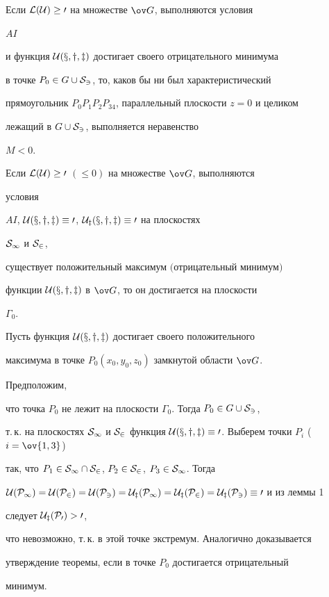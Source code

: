 \begin{lem} 


Если $\cal L(\cal U)\ge0$ на множестве $\ov G$, выполняются условия 


$AI$ 


и функция $\cal U(x,y,z)$ достигает своего отрицательного минимума 


в точке $P_0\in G\cup\cal S_3$, то, каков бы ни был характеристический 


прямоугольник $P_0P_1P_2P_34$, параллельный плоскости $z=0$ и целиком 


лежащий в $G\cup\cal S_3$, выполняется неравенство 


$M<0$. 


\end{lem} 


 


\begin{thm} 


Если $\cal L(\cal U)\ge0$ $(\le0)$ на множестве $\ov G$, выполняются 


условия 


$AI$, $\cal U(x,y,z)\equiv0$, $\cal U_z(x,y,z)\equiv0$ на плоскостях 


$\cal S_1$ и $\cal S_2$, 


существует положительный максимум $($отрицательный минимум$)$ 


функции $\cal U(x,y,z)$ в $\ov G$, то он достигается на плоскости 


$\Gamma_0$. 


\end{thm} 


 


\begin{pf} 


Пусть функция $\cal U(x,y,z)$ достигает своего положительного 


максимума в точке $P_0(x_0,y_0,z_0)$ замкнутой области $\ov G$. 


Предположим, 


что точка $P_0$ не лежит на плоскости $\Gamma_0$. Тогда $P_0\in 


G\cup\cal S_3$, 


т.\,к. на плоскостях $\cal S_1$ и $\cal S_2$ функция $\cal 


U(x,y,z)\equiv0$. Выберем точки $P_i$ ($i=\ov{1,3}$) 


так, что $P_1\in\cal S_1\cap\cal S_2$, $P_2\in\cal S_2$, $P_3\in\cal 


S_1$. Тогда 


$\cal U(P_1)=\cal U(P_2)=\cal U(P_3)=\cal U_z(P_1)=\cal U_z(P_2)=\cal 


U_z(P_3)\equiv0$ и из леммы 1 


следует $\cal U_z(P_0)>0$, 


что невозможно, т.\,к. в этой точке экстремум. Аналогично доказывается 


утверждение теоремы, если в точке $P_0$ достигается отрицательный 


минимум. 


\end{pf} 


